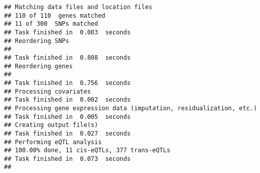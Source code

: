 \begin{knitrout}
\begin{kframe}
{\ttfamily\noindent\color{warningcolor}{\#\# Warning: package 'GenomicFeatures' was built under R version 3.3.1}}

{\ttfamily\noindent\color{warningcolor}{\#\# Warning: package 'GenomeInfoDb' was built under R version 3.3.1}}\begin{verbatim}
## Matching data files and location files 
## 110 of 110  genes matched
## 11 of 300  SNPs matched
## Task finished in  0.003  seconds
## Reordering SNPs
##  
## Task finished in  0.808  seconds
## Reordering genes
##  
## Task finished in  0.756  seconds
## Processing covariates 
## Task finished in  0.002  seconds
## Processing gene expression data (imputation, residualization, etc.) 
## Task finished in  0.005  seconds
## Creating output file(s) 
## Task finished in  0.027  seconds
## Performing eQTL analysis 
## 100.00% done, 11 cis-eQTLs, 377 trans-eQTLs
## Task finished in  0.073  seconds
## 
\end{verbatim}
\begin{alltt}
         \hlkwb{=} \hlstd{(}\hlstd{(}\hlstd{,} \hlstd{,}
                \hlstd{=}\hlstd{),} \hlstd{=}\hlstd{,}  \hlstd{=}\hlstd{)}

         \hlkwb{=} \hlstd{(}\hlstd{,} \hlstd{)}

        \hlopt{$} \hlkwb{=} \hlopt{$}\hlstd{values[,}\hlstd{(}\hlstd{,} \hlopt{$}\hlstd{values))]}
         \hlkwb{=} \hlstd{clin[}\hlstd{(}\hlstd{,} \hlstd{(clin)),]}

         \hlkwb{=} \hlstd{(}
                \hlopt{$}\hlopt{$}    
                \hlstd{=}\hlstd{,}
                \hlstd{=}\hlstd{,}
                \hlstd{=}\hlstd{)}
\end{alltt}



\end{kframe}
\end{knitrout}
